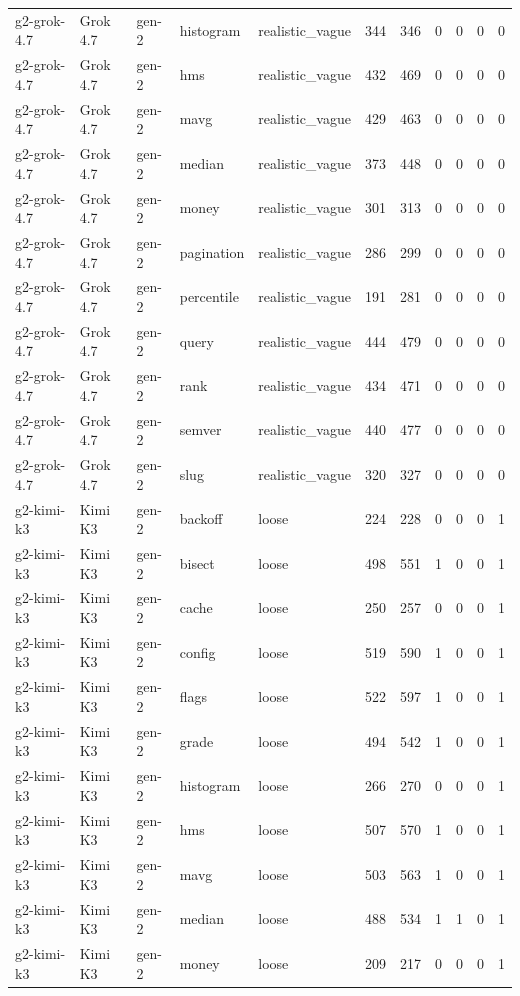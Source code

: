 \begin{tabular}{lllllllllll}
g2-grok-4.7 & Grok 4.7 & gen-2 & histogram & realistic\_vague & 344 & 346 & 0 & 0 & 0 & 0 \\
g2-grok-4.7 & Grok 4.7 & gen-2 & hms & realistic\_vague & 432 & 469 & 0 & 0 & 0 & 0 \\
g2-grok-4.7 & Grok 4.7 & gen-2 & mavg & realistic\_vague & 429 & 463 & 0 & 0 & 0 & 0 \\
g2-grok-4.7 & Grok 4.7 & gen-2 & median & realistic\_vague & 373 & 448 & 0 & 0 & 0 & 0 \\
g2-grok-4.7 & Grok 4.7 & gen-2 & money & realistic\_vague & 301 & 313 & 0 & 0 & 0 & 0 \\
g2-grok-4.7 & Grok 4.7 & gen-2 & pagination & realistic\_vague & 286 & 299 & 0 & 0 & 0 & 0 \\
g2-grok-4.7 & Grok 4.7 & gen-2 & percentile & realistic\_vague & 191 & 281 & 0 & 0 & 0 & 0 \\
g2-grok-4.7 & Grok 4.7 & gen-2 & query & realistic\_vague & 444 & 479 & 0 & 0 & 0 & 0 \\
g2-grok-4.7 & Grok 4.7 & gen-2 & rank & realistic\_vague & 434 & 471 & 0 & 0 & 0 & 0 \\
g2-grok-4.7 & Grok 4.7 & gen-2 & semver & realistic\_vague & 440 & 477 & 0 & 0 & 0 & 0 \\
g2-grok-4.7 & Grok 4.7 & gen-2 & slug & realistic\_vague & 320 & 327 & 0 & 0 & 0 & 0 \\
g2-kimi-k3 & Kimi K3 & gen-2 & backoff & loose & 224 & 228 & 0 & 0 & 0 & 1 \\
g2-kimi-k3 & Kimi K3 & gen-2 & bisect & loose & 498 & 551 & 1 & 0 & 0 & 1 \\
g2-kimi-k3 & Kimi K3 & gen-2 & cache & loose & 250 & 257 & 0 & 0 & 0 & 1 \\
g2-kimi-k3 & Kimi K3 & gen-2 & config & loose & 519 & 590 & 1 & 0 & 0 & 1 \\
g2-kimi-k3 & Kimi K3 & gen-2 & flags & loose & 522 & 597 & 1 & 0 & 0 & 1 \\
g2-kimi-k3 & Kimi K3 & gen-2 & grade & loose & 494 & 542 & 1 & 0 & 0 & 1 \\
g2-kimi-k3 & Kimi K3 & gen-2 & histogram & loose & 266 & 270 & 0 & 0 & 0 & 1 \\
g2-kimi-k3 & Kimi K3 & gen-2 & hms & loose & 507 & 570 & 1 & 0 & 0 & 1 \\
g2-kimi-k3 & Kimi K3 & gen-2 & mavg & loose & 503 & 563 & 1 & 0 & 0 & 1 \\
g2-kimi-k3 & Kimi K3 & gen-2 & median & loose & 488 & 534 & 1 & 1 & 0 & 1 \\
g2-kimi-k3 & Kimi K3 & gen-2 & money & loose & 209 & 217 & 0 & 0 & 0 & 1 \\

\end{tabular}

